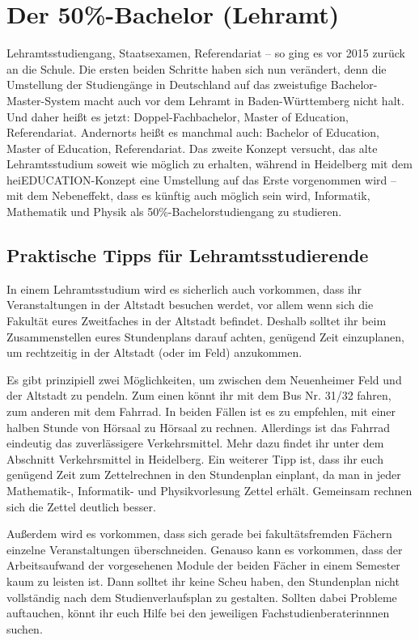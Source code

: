 
\section{Der 50\%-Bachelor (Lehramt)} %
\label{lehramt_allg}

Lehramtsstudiengang, Staatsexamen, Referendariat -- so ging es vor 2015 zurück an die Schule. Die ersten beiden Schritte haben sich nun verändert, denn die Umstellung der Studiengänge in Deutschland auf das zweistufige Bachelor-Master-System macht auch vor dem Lehramt in Baden-Württemberg nicht halt. Und daher heißt es jetzt: Doppel-Fachbachelor, Master of Education, Referendariat. Andernorts heißt es manchmal auch: Bachelor of Education, Master of Education, Referendariat. Das zweite Konzept versucht, das alte Lehramtsstudium soweit wie möglich zu erhalten, während in Heidelberg mit dem heiEDUCATION-Konzept eine Umstellung auf das Erste vorgenommen wird -- mit dem Nebeneffekt, dass es künftig auch möglich sein wird, Informatik, Mathematik und Physik als 50\%-Bachelorstudiengang zu studieren.

\subsection{Praktische Tipps für Lehramtsstudierende}
In einem Lehramtsstudium wird es sicherlich auch vorkommen, dass ihr Veranstaltungen in der Altstadt besuchen werdet, vor allem wenn sich die Fakultät eures Zweitfaches in der Altstadt befindet. Deshalb solltet ihr beim Zusammenstellen eures Stundenplans darauf achten, genügend Zeit einzuplanen, um rechtzeitig in der Altstadt (oder im Feld) anzukommen.

Es gibt prinzipiell zwei Möglichkeiten, um zwischen dem Neuenheimer Feld und der Altstadt zu pendeln. Zum einen könnt ihr mit dem Bus Nr. 31/32 fahren, zum anderen mit dem Fahrrad. In beiden Fällen ist es zu empfehlen, mit einer halben Stunde von Hörsaal zu Hörsaal zu rechnen. Allerdings ist das Fahrrad eindeutig das zuverlässigere Verkehrsmittel. Mehr dazu findet ihr unter dem Abschnitt Verkehrsmittel in Heidelberg.
Ein weiterer Tipp ist, dass ihr euch genügend Zeit zum Zettelrechnen in den Stundenplan einplant, da man in jeder Mathematik-, Informatik- und Physikvorlesung Zettel erhält. Gemeinsam rechnen sich die Zettel deutlich besser.

Außerdem wird es vorkommen, dass sich gerade bei fakultätsfremden Fächern einzelne Veranstaltungen überschneiden. Genauso kann es vorkommen, dass der Arbeitsaufwand der vorgesehenen Module der beiden Fächer in einem Semester kaum zu leisten ist. Dann solltet ihr keine Scheu haben, den Stundenplan nicht vollständig nach dem Studienverlaufsplan zu gestalten. Sollten dabei Probleme auftauchen, könnt ihr euch Hilfe bei den jeweiligen Fachstudienberaterinnnen suchen.


